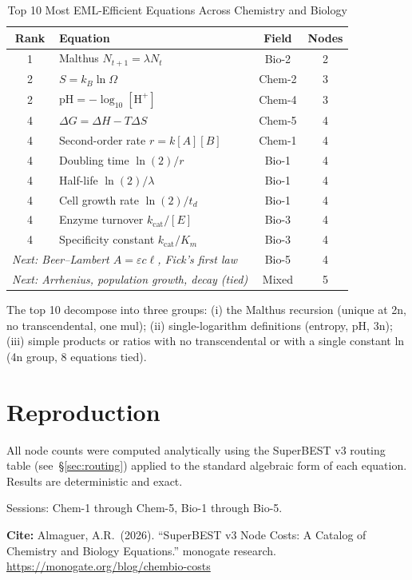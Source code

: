 \documentclass[12pt,a4paper]{article}
\theoremstyle{definition}
\begin{document}
\begin{table}[ht]
\centering
\caption{Top 10 Most EML-Efficient Equations Across Chemistry and Biology}
\label{tab:ranking}
\begin{tabular}{clcc}
\toprule
\textbf{Rank} & \textbf{Equation} & \textbf{Field} & \textbf{Nodes} \\
\midrule
1 & Malthus $N_{t+1} = \lambda N_t$ & Bio-2 & 2 \\
2 & $S = k_B \ln\Omega$ & Chem-2 & 3 \\
2 & $\mathrm{pH} = -\log_{10}[\mathrm{H}^+]$ & Chem-4 & 3 \\
4 & $\Delta G = \Delta H - T\Delta S$ & Chem-5 & 4 \\
4 & Second-order rate $r = k[A][B]$ & Chem-1 & 4 \\
4 & Doubling time $\ln(2)/r$ & Bio-1 & 4 \\
4 & Half-life $\ln(2)/\lambda$ & Bio-1 & 4 \\
4 & Cell growth rate $\ln(2)/t_d$ & Bio-1 & 4 \\
4 & Enzyme turnover $k_\mathrm{cat}/[E]$ & Bio-3 & 4 \\
4 & Specificity constant $k_\mathrm{cat}/K_m$ & Bio-3 & 4 \\
\midrule
\multicolumn{2}{l}{\textit{Next: Beer--Lambert $A=\varepsilon c\ell$, Fick's first law}} & Bio-5 & 4 \\
\multicolumn{2}{l}{\textit{Next: Arrhenius, population growth, decay (tied)}} & Mixed & 5 \\
\bottomrule
\end{tabular}
\end{table}

\noindent
The top 10 decompose into three groups:
(i) the Malthus recursion (unique at 2n, no transcendental, one mul);
(ii) single-logarithm definitions (entropy, pH, 3n);
(iii) simple products or ratios with no transcendental or with a single
constant ln (4n group, 8 equations tied).

\section*{Reproduction}

All node counts were computed analytically using the SuperBEST v3 routing
table (see~\S\ref{sec:routing}) applied to the standard algebraic form of
each equation.  Results are deterministic and exact.

Sessions: Chem-1 through Chem-5, Bio-1 through Bio-5.

\vspace{12pt}
\noindent\textbf{Cite:} Almaguer, A.R.\ (2026). ``SuperBEST v3 Node Costs:
A Catalog of Chemistry and Biology Equations.'' monogate research.
\url{https://monogate.org/blog/chembio-costs}
\end{document}
